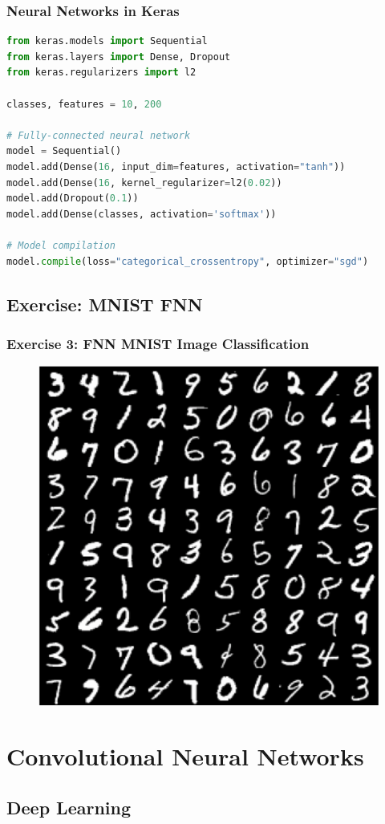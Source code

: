 \documentclass[aspectratio=1610]{beamer}
\begin{document}
\begin{frame}[fragile]
\frametitle{Neural Networks in Keras}

\begin{lstlisting}[language=Python]
from keras.models import Sequential
from keras.layers import Dense, Dropout
from keras.regularizers import l2

classes, features = 10, 200

# Fully-connected neural network
model = Sequential()
model.add(Dense(16, input_dim=features, activation="tanh"))
model.add(Dense(16, kernel_regularizer=l2(0.02))
model.add(Dropout(0.1))
model.add(Dense(classes, activation='softmax'))

# Model compilation
model.compile(loss="categorical_crossentropy", optimizer="sgd")
\end{lstlisting}

\end{frame}

\subsection{Exercise: MNIST FNN}
\label{subsec:exercise-fnn}

\begin{frame}
    \frametitle{Exercise 3: FNN MNIST Image Classification}
    
    \begin{figure}
        \centering
        \includegraphics[width=0.4\linewidth]{mnist.png}
    \end{figure}
\end{frame}

\section{Convolutional Neural Networks}
\label{sec:convolutional-neural-networks}

\subsection{Deep Learning}
\label{subsec:deep-learning}
\end{document}
